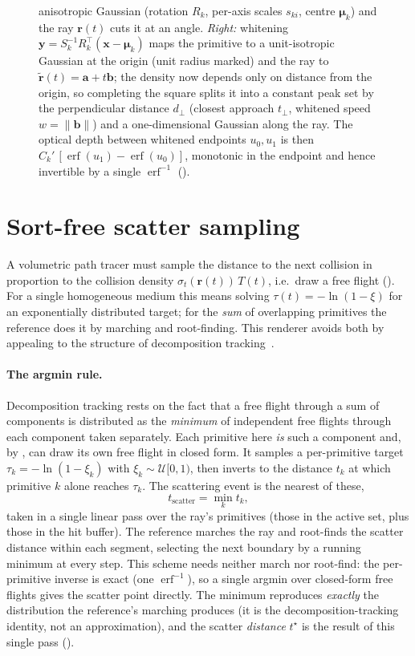 \begin{figure}[htp]
{  anisotropic Gaussian (rotation $R_k$, per-axis scales $s_{ki}$, centre $\bm{\mu}_k$) and the ray
$\bm{r}(t)$ cuts it at an angle. \emph{Right:} whitening
  $\bm{y}=S_k^{-1}R_k^{\!\top}(\bm{x}-\bm{\mu}_k)$ maps the primitive to a unit-isotropic Gaussian at
  the origin (unit radius marked) and the ray to $\tilde{\bm{r}}(t)=\bm{a}+t\bm{b}$; the density now
depends only on distance from the origin,
  so completing the square splits it into a constant peak set by the perpendicular distance $d_\perp$
  (closest approach $t_\perp$, whitened speed $w=\lVert\bm{b}\rVert$) and a one-dimensional Gaussian
  along the ray. The optical depth between whitened endpoints $u_0,u_1$ is then
  $C_k'\,[\operatorname{erf}(u_1)-\operatorname{erf}(u_0)]$, monotonic in the endpoint and hence
  invertible by a single $\operatorname{erf}^{-1}$ ().}
  \label{fig:optical-depth}
\end{figure}

\section{Sort-free scatter sampling}
\label{sec:adt}

A volumetric path tracer must sample the distance to the next collision in proportion to the collision
density $\sigma_t(\bm{r}(t))\,T(t)$, i.e.\ draw a free flight ().
For a single homogeneous medium this means solving $\tau(t) = -\ln(1-\xi)$ for an exponentially
distributed target; for the \emph{sum} of overlapping primitives the reference does it by marching and
root-finding. This renderer avoids both by appealing to the structure of decomposition
tracking~\cite{Kutz2017}.

\paragraph{The argmin rule.} Decomposition tracking rests on the fact that a free flight through a sum
of components is distributed as the \emph{minimum} of independent free flights through each component
taken separately. Each primitive here \emph{is} such a component and, by , can
draw its own free flight in closed form. It samples a per-primitive target
$\tau_k = -\ln(1-\xi_k)$ with $\xi_k\sim\mathcal{U}[0,1)$, then inverts to the distance $t_k$ at which
primitive $k$ alone reaches $\tau_k$. The scattering event is the nearest of these,
\[
  t_{\text{scatter}} = \min_k t_k ,
\]
taken in a single linear pass over the ray's primitives (those in the active set, plus those in the
hit buffer). The reference marches the ray and root-finds the scatter distance within each segment,
selecting the next boundary by a running minimum at every step. This scheme needs neither
march nor root-find: the per-primitive inverse is exact (one $\operatorname{erf}^{-1}$), so a single
argmin over closed-form free flights gives the scatter point directly. The minimum reproduces
\emph{exactly} the distribution the reference's marching produces (it is the decomposition-tracking
identity, not an approximation), and the scatter \emph{distance} $t^\star$ is the result of this single
pass ().


